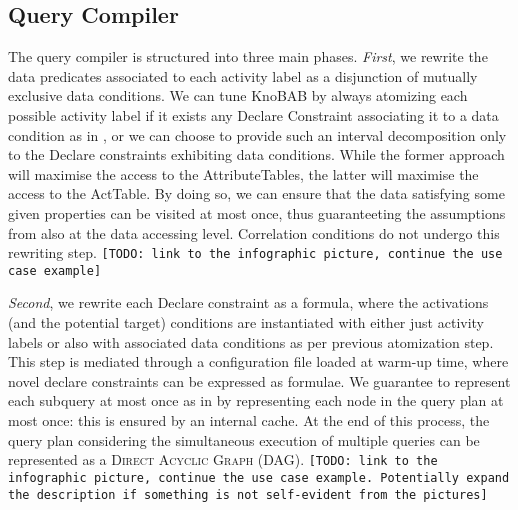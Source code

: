 \subsection{Query Compiler}\label{sec:qc}
The query compiler is structured into three main phases. \textit{First}, we rewrite the data predicates 
associated to each activity label as a 
disjunction of mutually exclusive data conditions. We can tune KnoBAB by always atomizing each possible activity label if it exists any Declare Constraint associating it to a data condition as in \cite{bpm21}, or we can choose to provide such an interval decomposition only to the Declare constraints exhibiting data conditions. While the former approach will maximise the access to the \textsf{AttributeTable}s, the latter will maximise the access to the \textsf{ActTable}. By doing so, we can ensure that the data satisfying some given properties can be visited at most once, thus guaranteeting the assumptions from \cite{BellatrecheKB21} also at the data accessing level. Correlation conditions do not undergo this rewriting step. \texttt{\color{red}[TODO: link to the infographic picture, continue the use case example]}

\textit{Second}, we rewrite each Declare constraint as a \xLTLf formula, where the activations (and the potential target) conditions are instantiated with either just activity labels or also with associated data conditions as per previous atomization step. This step is mediated through a configuration file loaded at warm-up time, where novel declare constraints can be expressed as \xLTLf formulae. We guarantee to represent each subquery at most once as in \cite{BellatrecheKB21} by representing each node in the query plan at most once: this is ensured by an internal cache. At the end of this process, the query plan considering the simultaneous execution of multiple queries can be represented as a \textsc{Direct Acyclic Graph} (DAG).  \texttt{\color{red}[TODO: link to the infographic picture, continue the use case example. Potentially expand the description if something is not self-evident from the pictures]}


